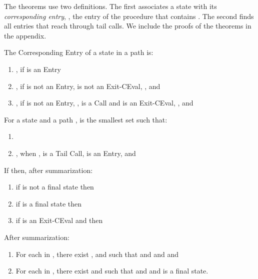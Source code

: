 \documentclass{LMCS}
\theoremstyle{definition} \newtheorem{property}[thm]{Property}
\begin{document}
The theorems use two definitions.
The first associates a state \astat{} with its \emph{corresponding entry},
\ie{}, the entry of the procedure that contains \astat.
The second finds all entries that reach \coren{\astat} through tail calls.
We include the proofs of the theorems in the appendix.
\begin{defi}
  The Corresponding Entry \coren{\astat} of a state {\astat} in a path  is:
  \begin{enumerate}[]
  \item
    \astat, if {\astat} is an Entry
  \item
    \astato, if {\astat} is not an Entry, \astatw{} is not an Exit-CEval,
    ,
    and 
  \item
    \astato, if {\astat} is not an Entry, 
    , \astatw{} is a Call 
    and \astatf{} is an Exit-CEval, , and 
    
  \end{enumerate}
\end{defi}

\begin{defi}
  For a state {\astat} and a path , \corens{\astat} is the
  smallest set such that: 
  \begin{enumerate}[]
  \item
    
  \item
    ,
    when , \astato{} is a Tail Call,
    \astatw{} is an Entry, and 
  \end{enumerate}
\end{defi}
\begin{thm}[Soundness]\label{thm:sum/tion-sound} 
  If  then, after summarization:
  \begin{enumerate}[]
  \item
    if  is not a final state then
    
  \item
    if  is a final state then 
  \item
    if  is an Exit-CEval and 
    then 
  \end{enumerate}
\end{thm}
\begin{thm}[Completeness]\label{thm:sum/tion-complete} 
  After summarization:
  \begin{enumerate}[]
  \item
    For each  in \seen,
    there exist \astato, \astatw{} and  such that 
     \;and\; 
     \;and\;
     \;and\;
    
  \item
    For each \lstat{} in \finals, 
    there exist \astat{} and  such that 
     \;and\;
     \;and\;
    \astat{} is a final state.
  \end{enumerate}
\end{thm}
\end{document}
